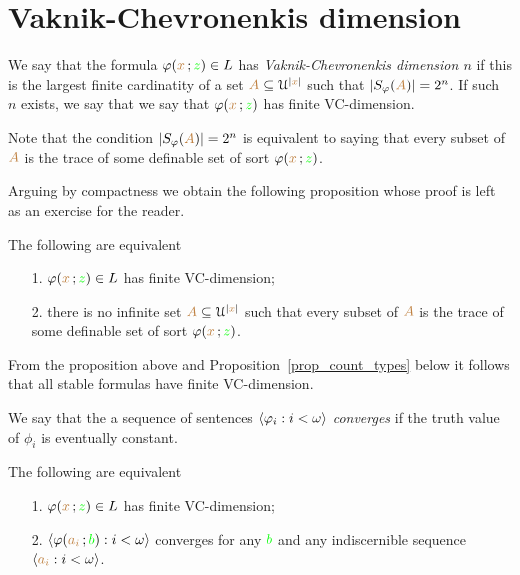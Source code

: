 \documentclass[creche.tex]{subfiles}
\begin{document}
\section{Vaknik-Chevronenkis dimension}
\label{sectionVC}

\def\ceq#1#2#3{\parbox{25ex}{$\displaystyle #1$}\medrel{#2}$\displaystyle  #3$}

We say that the formula $\varphi({\color{brown} x}\,;{\color{green} z})\in L$ has \emph{Vaknik-Chevronenkis dimension $n$\/} if this is the largest finite cardinatity of a set ${\color{brown} A}\subseteq\EuScript U^{|{\color{brown} x}|}$ such that $|S_\varphi({\color{brown} A})|=2^n$. If such $n$ exists, we say that we say that  $\varphi({\color{brown} x}\,;{\color{green} z})$ has finite VC-dimension. 

Note that the condition $|S_\varphi({\color{brown} A})|=2^n$ is equivalent to saying that every subset of ${\color{brown} A}$ is the trace of some definable set of sort $\varphi({\color{brown} x}\,;{\color{green} z})$.

Arguing by compactness we obtain the following proposition whose proof is left as an exercise for the reader.

\begin{proposition}
The following are equivalent 
\begin{itemize}
\item[1.] $\varphi({\color{brown} x}\,;{\color{green} z})\in L$ has finite VC-dimension;
\item[2.] there is no infinite set ${\color{brown} A}\subseteq\EuScript U^{|{\color{brown} x}|}$ such that every subset of ${\color{brown} A}$ is the trace of some definable set of sort $\varphi({\color{brown} x}\,;{\color{green} z})$.\QED
\end{itemize}
\end{proposition}

From the proposition above and Proposition~\ref{prop_count_types} below it follows that all stable formulas have finite VC-dimension.

We say that the a sequence of sentences $\langle\varphi_i:i<\omega\rangle$ \emph{converges\/} if the truth value of $\phi_i$ is eventually constant.  

\begin{lemma}\label{lem_altrank}
The following are equivalent
\begin{itemize}
\item[1.] $\varphi({\color{brown} x}\,;{\color{green} z})\in L$ has finite VC-dimension;
\item[2.] $\langle\varphi({\color{brown} a_i}\,;{\color{green} b}):i<\omega\rangle$ converges for any ${\color{green} b}$ and any indiscernible sequence $\langle{\color{brown}a_i}:i<\omega\rangle$.
\end{itemize}
\end{lemma}
\end{document}
